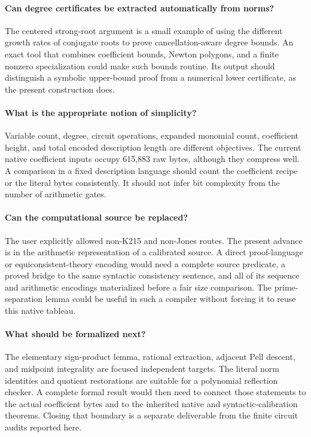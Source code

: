 \documentclass[11pt]{article}
\theoremstyle{definition}
\theoremstyle{remark}
\begin{document}
\paragraph{Can degree certificates be extracted automatically from norms?}
The centered strong-root argument is a small example of using the
different growth rates of conjugate roots to prove cancellation-aware
degree bounds. An exact tool that combines coefficient bounds, Newton
polygons, and a finite nonzero specialization could make such bounds
routine. Its output should distinguish a symbolic upper-bound proof
from a numerical lower certificate, as the present construction does.

\paragraph{What is the appropriate notion of simplicity?}
Variable count, degree, circuit operations, expanded monomial count,
coefficient height, and total encoded description length are different
objectives. The current native coefficient inputs occupy 615,883 raw
bytes, although they compress well. A comparison in a fixed description
language should count the coefficient recipe or the literal bytes
consistently. It should not infer bit complexity from the number of
arithmetic gates.

\paragraph{Can the computational source be replaced?}
The user explicitly allowed non-K215 and non-Jones routes. The present
advance is in the arithmetic representation of a calibrated source.
A direct proof-language or equiconsistent-theory encoding would need
a complete source predicate, a proved bridge to the same syntactic
consistency sentence, and all of its sequence and arithmetic encodings
materialized before a fair size comparison. The prime-separation lemma
could be useful in such a compiler without forcing it to reuse this
native tableau.

\paragraph{What should be formalized next?}
The elementary sign-product lemma, rational extraction, adjacent Pell
descent, and midpoint integrality are focused independent targets.
The literal norm identities and quotient restorations are suitable for
a polynomial reflection checker. A complete formal result would then
need to connect those statements to the actual coefficient bytes and
to the inherited native and syntactic-calibration theorems. Closing that
boundary is a separate deliverable from the finite circuit audits
reported here.
\end{document}
